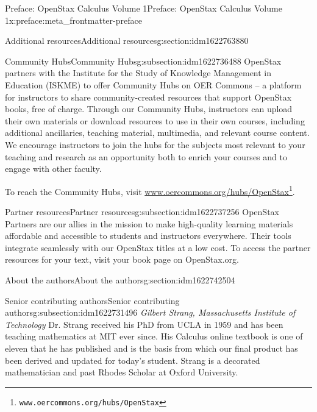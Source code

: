 \documentclass[oneside,10pt,]{book}
\numberwithin{equation}{section}
\begin{document}
\begin{preface}{Preface: OpenStax Calculus Volume 1}{}{Preface: OpenStax Calculus Volume 1}{}{}{x:preface:meta_frontmatter-preface}
\begin{sectionptx}{Additional resources}{}{Additional resources}{}{}{g:section:idm1622763880}
\begin{subsectionptx}{Community Hubs}{}{Community Hubs}{}{}{g:subsection:idm1622736488}
OpenStax partners with the Institute for the Study of Knowledge Management in Education (ISKME) to offer Community Hubs on OER Commons – a platform for instructors to share community-created resources that support OpenStax books, free of charge. Through our Community Hubs, instructors can upload their own materials or download resources to use in their own courses, including additional ancillaries, teaching material, multimedia, and relevant course content. We encourage instructors to join the hubs for the subjects most relevant to your teaching and research as an opportunity both to enrich your courses and to engage with other faculty.%
\par
To reach the Community Hubs, visit \href{www.oercommons.org/hubs/OpenStax}{www.oercommons.org\slash{}hubs\slash{}OpenStax}\footnote{\nolinkurl{www.oercommons.org/hubs/OpenStax}\label{g:fn:idm1622739432}}.%
\end{subsectionptx}
%
%
\typeout{************************************************}
\typeout{************************************************}
%
\begin{subsectionptx}{Partner resources}{}{Partner resources}{}{}{g:subsection:idm1622737256}
OpenStax Partners are our allies in the mission to make high-quality learning materials affordable and accessible to students and instructors everywhere. Their tools integrate seamlessly with our OpenStax titles at a low cost. To access the partner resources for your text, visit your book page on OpenStax.org.%
\end{subsectionptx}
\end{sectionptx}
%
%
\typeout{************************************************}
\typeout{************************************************}
%
\begin{sectionptx}{About the authors}{}{About the authors}{}{}{g:section:idm1622742504}
%
%
\typeout{************************************************}
\typeout{************************************************}
%
\begin{subsectionptx}{Senior contributing authors}{}{Senior contributing authors}{}{}{g:subsection:idm1622731496}
\emph{Gilbert Strang, Massachusetts Institute of Technology} Dr. Strang received his PhD from UCLA in 1959 and has been teaching mathematics at MIT ever since. His Calculus online textbook is one of eleven that he has published and is the basis from which our final product has been derived and updated for today’s student. Strang is a decorated mathematician and past Rhodes Scholar at Oxford University.%

\end{subsectionptx}
\end{sectionptx}
\end{preface}
\end{document}
